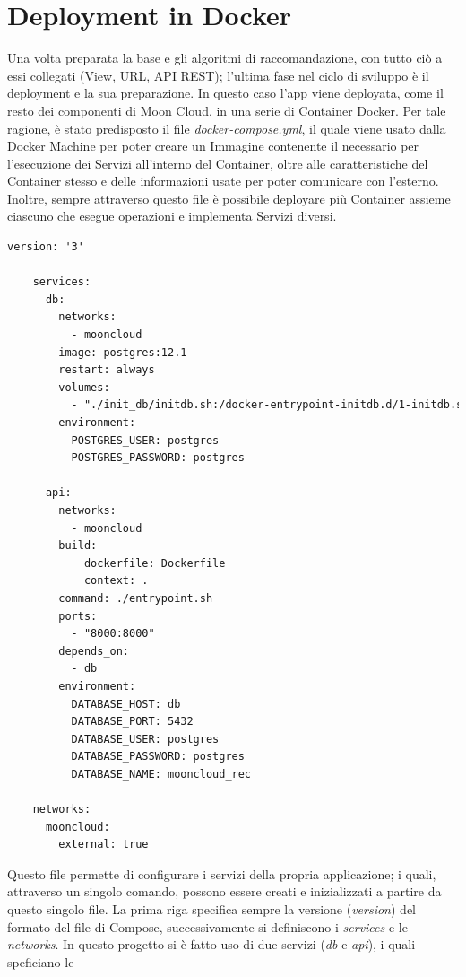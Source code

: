 \section*{Deployment in Docker}
Una volta preparata la base e gli algoritmi di raccomandazione, con tutto ciò a essi collegati (View, URL, API REST); l'ultima fase nel ciclo di sviluppo è il 
deployment e la sua preparazione. In questo caso l'app viene deployata, come il resto dei componenti di Moon Cloud, in una serie di Container Docker. Per 
tale ragione, è stato predisposto il file \textit{docker-compose.yml}, il quale viene usato dalla Docker Machine per poter creare un Immagine contenente 
il necessario per l'esecuzione dei Servizi all'interno del Container, oltre alle caratteristiche del Container stesso e delle informazioni usate per poter 
comunicare con l'esterno. Inoltre, sempre attraverso questo file è possibile deployare più Container assieme ciascuno che esegue operazioni e 
implementa Servizi diversi.
\lstset{style=python_code_style}
\begin{lstlisting}[language=Xml, label=lst:docker_compose, caption={Contenuto del file docker-compose.yml per il deployment del sistema di raccomandazione 
    all'interno di un Container.}]
    version: '3'
 
    services:
      db:
        networks:
          - mooncloud
        image: postgres:12.1
        restart: always
        volumes:
          - "./init_db/initdb.sh:/docker-entrypoint-initdb.d/1-initdb.sh"
        environment:
          POSTGRES_USER: postgres
          POSTGRES_PASSWORD: postgres
    
      api:
        networks:
          - mooncloud
        build:
            dockerfile: Dockerfile
            context: .
        command: ./entrypoint.sh
        ports:
          - "8000:8000"
        depends_on:
          - db
        environment:
          DATABASE_HOST: db
          DATABASE_PORT: 5432
          DATABASE_USER: postgres
          DATABASE_PASSWORD: postgres
          DATABASE_NAME: mooncloud_rec
    
    networks:
      mooncloud:
        external: true
\end{lstlisting}
%
Questo file permette di configurare i servizi della propria applicazione; i quali, attraverso un singolo comando, possono essere creati e inizializzati a 
partire da questo singolo file.
La prima riga specifica sempre la versione (\textit{version}) del formato del file di Compose, successivamente si definiscono i \textit{services} e 
le \textit{networks}. In questo progetto si è fatto uso di due servizi (\textit{db} e \textit{api}), i quali speficiano le 
